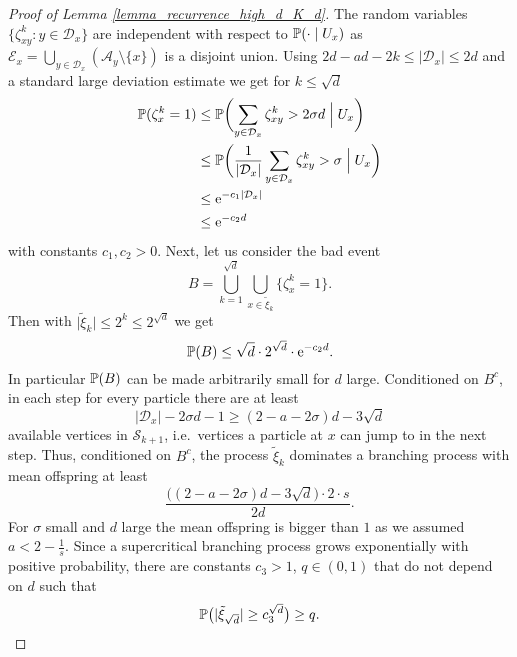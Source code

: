 \begin{proof}[Proof of Lemma \ref{lemma_recurrence_high_d_K_d}]
The random variables $\{\zeta_{xy}^k \colon y \in \mathcal{D}_x\}$ are independent with respect to $\P(\cdot \mid U_x)$ as $\mathcal{E}_x = \bigcup_{y \in \mathcal{D}_x} (\mathcal{A}_y \setminus \{x\})$ is a disjoint union. Using $2d-ad-2k \leq \lvert\mathcal{D}_x\rvert \leq 2d$ and a standard large deviation estimate we get for $k \leq \sqrt{d}$
\begin{align*}
 \P(\zeta_x^k=1) &\leq \P\biggl(\sum_{y \in \mathcal{D}_x} \zeta_{xy}^k > 2\sigma d \Bigm\vert U_x\biggr) \\
                 &\leq \P\biggl(\frac{1}{\lvert \mathcal{D}_x\rvert} \sum_{y \in \mathcal{D}_x} \zeta_{xy}^k > \sigma \Bigm\vert U_x \biggr)\\
                 &\leq \e^{-c_1\lvert\mathcal{D}_x\rvert} \\
                 &\leq \e^{-c_2 d}
\end{align*}
with constants $c_1, c_2 > 0$. Next, let us consider the bad event
\begin{equation*}
 B = \bigcup_{k=1}^{\sqrt{d}} \bigcup_{x \in \tilde{\xi}_k} \{\zeta_x^k=1\}.
\end{equation*}
Then with $\lvert\tilde{\xi}_k\rvert \leq 2^k \leq 2^{\sqrt{d}}$ we get
\begin{equation*}
 \P(B) \leq \sqrt{d} \cdot 2^{\sqrt{d}} \cdot \e^{-c_2 d}.
\end{equation*}
In particular $\P(B)$ can be made arbitrarily small for $d$ large.
Conditioned on $B^c$, in each step for every particle there are at least 
\begin{equation*}
\lvert\mathcal{D}_x\rvert-2 \sigma d -1 \geq (2-a-2\sigma)d - 3 \sqrt{d} 
\end{equation*}
available vertices in $\mathcal{S}_{k+1}$, i.e.~vertices a particle at $x$ can jump to in the next step. Thus, conditioned on $B^c$, the process $\tilde{\xi}_k$ dominates a branching process with mean offspring at least
\begin{equation*}
 \frac{\bigl((2-a-2\sigma)d - 3 \sqrt{d}\bigr) \cdot 2 \cdot s}{2d}.
\end{equation*}
For $\sigma$ small and $d$ large the mean offspring is bigger than $1$ as we assumed $a < 2-\frac{1}{s}$. Since a supercritical branching process grows exponentially with positive probability, there are constants $c_3 >1$, $q \in (0,1)$ that do not depend on $d$ such that
\begin{equation}\label{proof_recurrence_high_d_K_d}
\P\bigl( \lvert\tilde{\xi}_{\sqrt{d}}\rvert \geq c_3^{\sqrt{d}}\bigr) \geq q.

\end{equation}
\end{proof}
